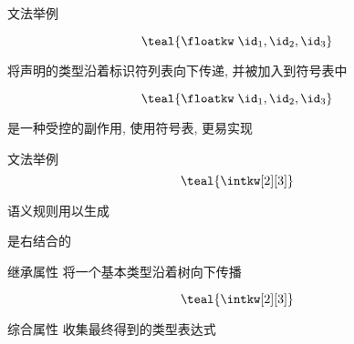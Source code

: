 \begin{frame}{}
  \begin{center}
    文法举例

    \[
      \teal{\floatkw\; \id_{1}, \id_{2}, \id_{3}}
    \]
  \end{center}
\end{frame}

\begin{frame}{}
  \begin{center}
     将声明的类型沿着标识符列表向下传递, 并被加入到符号表中

    \[
        \teal{\floatkw\; \id_{1}, \id_{2}, \id_{3}}
    \]


    \pause
    \vspace{0.30cm}
    是一种受控的副作用, 使用符号表, 更易实现
  \end{center}
\end{frame}

\begin{frame}{}
  \begin{center}
    文法举例
    \[
      \teal{\intkw[2][3]}
    \]

    \pause
    \vspace{0.30cm}
    语义规则用以生成 

    \pause
    \vspace{0.30cm}
    \teal{$[\;]$}是右结合的
  \end{center}
\end{frame}

\begin{frame}{}
  \begin{center}
    继承属性  将一个基本类型沿着树向下传播

    \[
        \teal{\intkw[2][3]}
    \]


    \vspace{0.30cm}
    综合属性  收集最终得到的类型表达式
  \end{center}
\end{frame}

